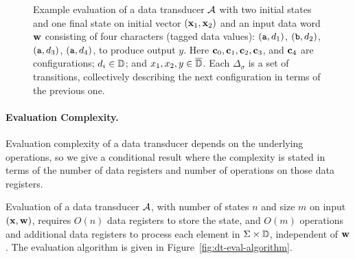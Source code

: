 \begin{figure}[t]
\centering \small
{}
\caption{Example evaluation of a data transducer $\mathcal{A}$ with two initial states and one final state on initial vector $(\textbf{x}_1, \textbf{x}_2)$ and an input data word $\textbf{w}$ consisting of four characters (tagged data values):
$(\texttt{a},d_1)$, $(\texttt{b},d_2)$, $(\texttt{a},d_3)$, $(\texttt{a}, d_4)$, to produce output $y$.
Here $\textbf{c}_0, \textbf{c}_1, \textbf{c}_2, \textbf{c}_3$, and $\textbf{c}_4$ are configurations; $d_i \in \mathbb{D}$; and $x_1, x_2, y \in \overline{\mathbb{D}{}}$. Each $\Delta_\sigma$ is a set of transitions, collectively describing the next configuration in terms of the previous one.}
\label{fig:dt-eval-illustration}
\end{figure}

\paragraph*{Evaluation Complexity.}
Evaluation complexity of a data transducer depends on the underlying
operations, so we give a conditional result where the complexity
is stated in terms of the number of data registers and number of
operations on those data registers.

\begin{theorem}
Evaluation of a data transducer $\mathcal{A}$, with number of states $n$ and size $m$ on input $(\textbf{x},\textbf{w})$, requires
$O(n)$ data registers to store the state,
and $O(m)$ operations and additional data registers
to process each element in $\Sigma \times \mathbb{D}$, independent of $\textbf{w}$.
The evaluation algorithm is given in Figure~\ref{fig:dt-eval-algorithm}.
\label{thm:dt-eval}
\end{theorem}

